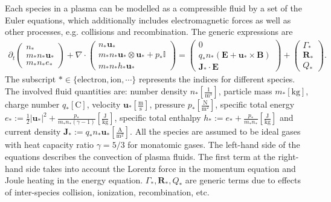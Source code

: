 \documentclass{article}
\begin{document}
Each species in a plasma can be modelled as a compressible fluid by a set of the Euler equations, which additionally includes electromagnetic forces as well as other processes, e.g. collisions and recombination. The generic expressions are
\begin{align} \label{equ:euler_}
    \partial_t
    \begin{pmatrix}
    n_* \\
    m_*n_* \mathbf{u}_* \\
    m_*n_* e_*
    \end{pmatrix}
    + \nabla \cdot
    \begin{pmatrix}
    n_* \mathbf{u}_* \\
    m_*n_* \mathbf{u}_* \otimes \mathbf{u}_* + p_*\mathbb{I} \\
    m_*n_* h_* \mathbf{u}_*
    \end{pmatrix}
    =
    \begin{pmatrix}
    0 \\
    q_*n_*(\mathbf{E} + \mathbf{u}_* \times \mathbf{B}) \\
    \mathbf{J}_* \cdot \mathbf{E}
    \end{pmatrix}
    +
    \begin{pmatrix}
    \Gamma_* \\
    \mathbf{R}_* \\
    Q_*
    \end{pmatrix}.
\end{align}
The subscript $*\in \{\text{electron}, \text{ion}, \cdots\}$ represents the indices for different species. The involved fluid quantities are: number density $n_*[\frac{1}{\text{m}^3}]$, particle mass $m_*[\text{kg}]$,  charge number $q_*[\text{C}]$, velocity $\mathbf{u}_*[\frac{\text{m}}{\text{s}}]$, pressure $p_*[\frac{\text{N}}{\text{m}^2}]$, specific total energy $e_* := \frac{1}{2}|\mathbf{u}_*|^2 + \frac{p_*}{m_*n_*(\gamma - 1)}[\frac{\text{J}}{\text{kg}}]$, specific total enthalpy $h_* := e_* + \frac{p_*}{m_*n_*}[\frac{\text{J}}{\text{kg}}]$ and current density $\mathbf{J}_* := q_*n_*\mathbf{u}_*[\frac{\text{A}}{\text{m}^2}]$. All the species are assumed to be ideal gases with heat capacity ratio $\gamma=5/3$ for monatomic gases. The left-hand side of the equations describes the convection of plasma fluids. The first term at the right-hand side takes into account the Lorentz force in the momentum equation and Joule heating in the energy equation. $\Gamma_*, \mathbf{R}_*, Q_*$ are generic terms due to effects of inter-species collision, ionization, recombination, etc. 
\end{document}
